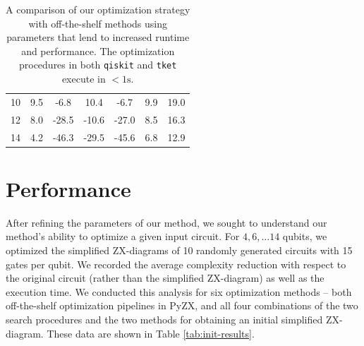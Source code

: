 \begin{table}[t]
{\begin{tabular}{@{}ccccccc@{}}
  10                               & 9.5      & -6.8     & 10.4     & -6.7     & 9.9         & 19.0         \\
  12                               & 8.0      & -28.5     & -10.6     & -27.0     & 8.5         & 16.3         \\
  14                               & 4.2      & -46.3     & -29.5     & -45.6     & 6.8         & 12.9         \\
  \bottomrule
  \end{tabular}}
  \caption{\label{tab:compare-results}
    A comparison of our optimization strategy with off-the-shelf methods using parameters that lend to increased runtime and performance.
    The optimization procedures in both {\color{gray}\texttt{qiskit}} and {\color{gray}\texttt{tket}} execute in $<1\text{s}$.
  }
\end{table}




\section{Performance}

After refining the parameters of our method, we sought to understand our method's ability to optimize a given input circuit.
For $4, 6, \dots 14$ qubits, we optimized the simplified ZX-diagrams of 10 randomly generated circuits with 15 gates per qubit.
We recorded the average complexity reduction with respect to the original circuit (rather than the simplified ZX-diagram) as well as the execution time.
We conducted this analysis for six optimization methods -- both off-the-shelf optimization pipelines in PyZX, and all four combinations of the two search procedures and the two methods for obtaining an initial simplified ZX-diagram.
These data are shown in Table \ref{tab:init-results}.

